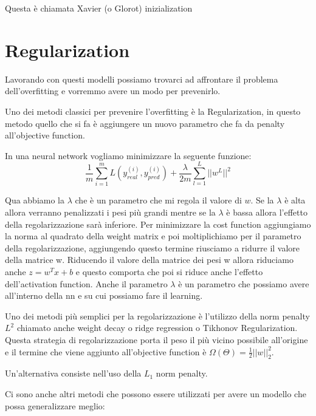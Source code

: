 \documentclass[14pt]{extreport}
\begin{document}
Questa è chiamata Xavier (o Glorot) inizialization

\section{Regularization}

Lavorando con questi modelli possiamo trovarci ad affrontare il problema 
dell'overfitting e vorremmo avere un modo per prevenirlo.

Uno dei metodi classici per prevenire l'overfitting è la Regularization, in questo metodo
quello che si fa è aggiungere un nuovo parametro che fa da penalty all'objective function.


In una neural network vogliamo minimizzare la seguente funzione: 
$$\frac{1}{m}\sum_{i=1}^m L(y_{real}^{(i)},y_{pred}^{(i)}) + \frac{\lambda}{2m}\sum_{l=1}^L ||w^L||^2$$

Qua abbiamo la $\lambda$ che è un parametro che mi regola il valore di $w$.
Se la $\lambda$ è alta allora verranno penalizzati i pesi più grandi mentre se la $\lambda$ è bassa allora 
l'effetto della regolarizzazione sarà inferiore.
Per minimizzare la cost function aggiungiamo la norma al quadrato della weight matrix e poi moltiplichiamo per il parametro 
della regolarizzazione, aggiungendo questo termine riusciamo a ridurre il valore della matrice w.
Riducendo il valore della matrice dei pesi w allora riduciamo anche $z = w^Tx + b$ e questo comporta che poi si riduce anche 
l'effetto dell'activation function.
Anche il parametro $\lambda$ è un parametro che possiamo avere all'interno della nn e su cui possiamo fare il learning.


Uno dei metodi più semplici per la regolarizzazione è l'utilizzo della norm penalty $L^2$
chiamato anche weight decay o ridge regression o Tikhonov Regularization.
Questa strategia di regolarizzazione porta il peso il più vicino possibile all'origine e 
il termine che viene aggiunto all'objective function è $\Omega(\Theta) = \frac{1}{2}||w||_2^2$.

Un'alternativa consiste nell'uso della $L_1$ norm penalty.

Ci sono anche altri metodi che possono essere utilizzati per avere un modello che possa generalizzare meglio:
\end{document}
